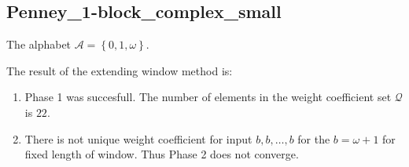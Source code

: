 \subsection{ Penney\_1-block\_complex\_small }

\label{subsec:Penney1-blockcomplexsmall}

The alphabet $\mathcal{A} =\left\{0, 1, \omega\right\}$.

\noindent The result of the extending window method is:
\begin{enumerate}
    \item Phase 1 was succesfull.
The number of elements in the weight coefficient set $\mathcal{Q}$ is $22$.

    \item There is not unique weight coefficient for input $b,b,\dots,b$ for the $b= \omega + 1 $ for fixed length of window. Thus Phase 2 does not converge.

\end{enumerate}
